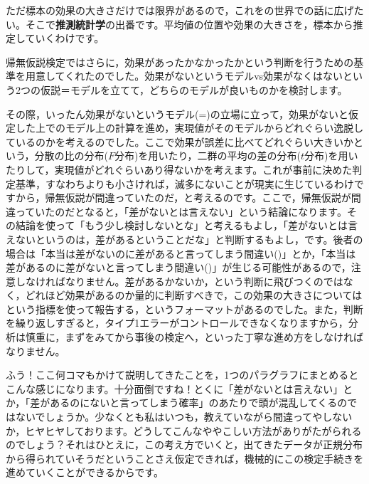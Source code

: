 \documentclass{ltjbook}
\begin{document}
ただ標本の効果の大きさだけでは限界があるので，これをの世界での話に広げたい。そこで\textbf{推測統計学}の出番です。平均値の位置や効果の大きさを，標本から推定していくわけです。

帰無仮説検定ではさらに，効果があったかなかったかという判断を行うための基準を用意してくれたのでした。効果がないというモデルvs効果がなくはないという2つの仮説＝モデルを立てて，どちらのモデルが良いものかを検討します。

その際，いったん効果がないというモデル(=)の立場に立って，効果がないと仮定した上でのモデル上の計算を進め，実現値がそのモデルからどれぐらい逸脱しているのかを考えるのでした。ここで効果が誤差に比べてどれぐらい大きいかという，分散の比の分布($F$分布)を用いたり，二群の平均の差の分布($t$分布)を用いたりして，実現値がどれぐらいあり得ないかを考えます。これが事前に決めた判定基準，すなわちよりも小さければ，滅多にないことが現実に生じているわけですから，帰無仮説が間違っていたのだ，と考えるのです。ここで，帰無仮説が間違っていたのだとなると，「差がないとは言えない」という結論になります。その結論を使って「もう少し検討しないとな」と考えるもよし，「差がないとは言えないというのは，差があるということだな」と判断するもよし，です。後者の場合は「本当は差がないのに差があると言ってしまう間違い()」とか，「本当は差があるのに差がないと言ってしまう間違い()」が生じる可能性があるので，注意しなければなりません。差があるかないか，という判断に飛びつくのではなく，どれほど効果があるのか量的に判断すべきで，この効果の大きさについてはという指標を使って報告する，というフォーマットがあるのでした。また，判断を繰り返しすぎると，タイプ1エラーがコントロールできなくなりますから，分析は慎重に，まずをみてから事後の検定へ，といった丁寧な進め方をしなければなりません。

ふう！ここ何コマもかけて説明してきたことを，1つのパラグラフにまとめるとこんな感じになります。十分面倒ですね！とくに「差がないとは言えない」とか，「差があるのにないと言ってしまう確率」のあたりで頭が混乱してくるのではないでしょうか。少なくとも私はいつも，教えていながら間違ってやしないか，ヒヤヒヤしております。どうしてこんなややこしい方法がありがたがられるのでしょう？それはひとえに，この考え方でいくと，出てきたデータが正規分布から得られていそうだということさえ仮定できれば，機械的にこの検定手続きを進めていくことができるからです。
\end{document}
